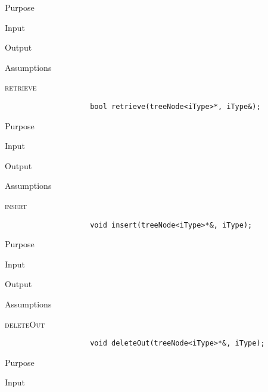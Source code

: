 \documentclass[pdftex, 12pt]{article}
\begin{document}
\begin{description}
\begin{description}
\begin{description}
\begin{description}
					\item{Purpose}

					\item{Input}

					\item{Output}

					\item{Assumptions}

				\end{description}
			\item{\textsc{retrieve}}
				\begin{lstlisting}
					bool retrieve(treeNode<iType>*, iType&);
				\end{lstlisting}
				\begin{description}

					\item{Purpose}

					\item{Input}

					\item{Output}

					\item{Assumptions}

				\end{description}
			\item{\textsc{insert}}
				\begin{lstlisting}
					void insert(treeNode<iType>*&, iType);
				\end{lstlisting}
				\begin{description}

					\item{Purpose}

					\item{Input}

					\item{Output}

					\item{Assumptions}

				\end{description}
			\item{\textsc{deleteOut}}
				\begin{lstlisting}
					void deleteOut(treeNode<iType>*&, iType);
				\end{lstlisting}
				\begin{description}

					\item{Purpose}

					\item{Input}


\end{description}
\end{description}
\end{description}
\end{description}
\end{document}
